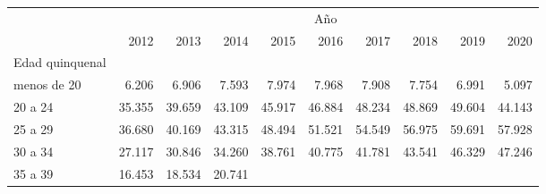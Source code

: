 \begin{tabular}{llllllllll}
\cline{1-10}
\multicolumn{1}{c}{} &
  \multicolumn{9}{|c}{Año} \\
\multicolumn{1}{c}{} &
  \multicolumn{1}{|r}{2012} &
  \multicolumn{1}{r}{2013} &
  \multicolumn{1}{r}{2014} &
  \multicolumn{1}{r}{2015} &
  \multicolumn{1}{r}{2016} &
  \multicolumn{1}{r}{2017} &
  \multicolumn{1}{r}{2018} &
  \multicolumn{1}{r}{2019} &
  \multicolumn{1}{r}{2020} \\
\cline{1-10}
\multicolumn{1}{l}{Edad quinquenal} &
  \multicolumn{1}{|r}{} &
  \multicolumn{1}{r}{} &
  \multicolumn{1}{r}{} &
  \multicolumn{1}{r}{} &
  \multicolumn{1}{r}{} &
  \multicolumn{1}{r}{} &
  \multicolumn{1}{r}{} &
  \multicolumn{1}{r}{} &
  \multicolumn{1}{r}{} \\
\multicolumn{1}{l}{\hspace{1em}menos de 20} &
  \multicolumn{1}{|r}{6.206} &
  \multicolumn{1}{r}{6.906} &
  \multicolumn{1}{r}{7.593} &
  \multicolumn{1}{r}{7.974} &
  \multicolumn{1}{r}{7.968} &
  \multicolumn{1}{r}{7.908} &
  \multicolumn{1}{r}{7.754} &
  \multicolumn{1}{r}{6.991} &
  \multicolumn{1}{r}{5.097} \\
\multicolumn{1}{l}{\hspace{1em}20 a 24} &
  \multicolumn{1}{|r}{35.355} &
  \multicolumn{1}{r}{39.659} &
  \multicolumn{1}{r}{43.109} &
  \multicolumn{1}{r}{45.917} &
  \multicolumn{1}{r}{46.884} &
  \multicolumn{1}{r}{48.234} &
  \multicolumn{1}{r}{48.869} &
  \multicolumn{1}{r}{49.604} &
  \multicolumn{1}{r}{44.143} \\
\multicolumn{1}{l}{\hspace{1em}25 a 29} &
  \multicolumn{1}{|r}{36.680} &
  \multicolumn{1}{r}{40.169} &
  \multicolumn{1}{r}{43.315} &
  \multicolumn{1}{r}{48.494} &
  \multicolumn{1}{r}{51.521} &
  \multicolumn{1}{r}{54.549} &
  \multicolumn{1}{r}{56.975} &
  \multicolumn{1}{r}{59.691} &
  \multicolumn{1}{r}{57.928} \\
\multicolumn{1}{l}{\hspace{1em}30 a 34} &
  \multicolumn{1}{|r}{27.117} &
  \multicolumn{1}{r}{30.846} &
  \multicolumn{1}{r}{34.260} &
  \multicolumn{1}{r}{38.761} &
  \multicolumn{1}{r}{40.775} &
  \multicolumn{1}{r}{41.781} &
  \multicolumn{1}{r}{43.541} &
  \multicolumn{1}{r}{46.329} &
  \multicolumn{1}{r}{47.246} \\
\multicolumn{1}{l}{\hspace{1em}35 a 39} &
  \multicolumn{1}{|r}{16.453} &
  \multicolumn{1}{r}{18.534} &
  \multicolumn{1}{r}{20.741} &

\end{tabular}
